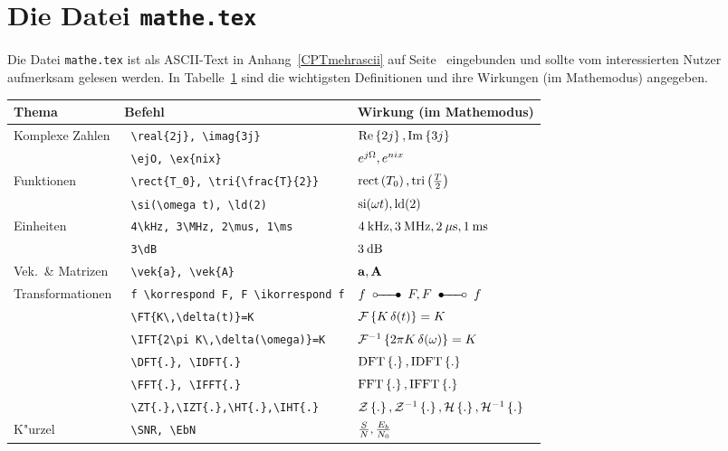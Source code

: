 \section{Die Datei {\tt mathe.tex}} \label{SUBmathe}
%
Die Datei {\tt mathe.tex} ist als ASCII-Text in Anhang~\ref{CPTmehrascii}
auf Seite~\pageref{CPTmehrascii} eingebunden und sollte vom interessierten Nutzer
aufmerksam gelesen werden. In Tabelle~\ref{TABmathe} sind die wichtigsten Definitionen
und ihre Wirkungen (im Mathemodus) angegeben.
%
\begin{table}[htb]\label{TABmathe}
\begin{center}
\begin{tabular}{|l|l|l|}
  \hline
  Thema               & Befehl                                    & Wirkung (im Mathemodus)\\
  \hline
  Komplexe Zahlen     & \verb+ \real{2j}, \imag{3j}             + & $\mathrm{Re}\left\{2j\right\}, \mathrm{Im}\left\{3j\right\}$\\
                      & \verb+ \ejO, \ex{nix}                   + & $e^{j\Omega}, e^{nix}$\\
  Funktionen          & \verb+ \rect{T_0}, \tri{\frac{T}{2}}    + & $\mathrm{rect}\left(T_0\right), \mathrm{tri}\left(\frac{T}{2}\right)$\\
                      & \verb+ \si(\omega t), \ld(2)            + & $\mathrm{si}(\omega t), \mathrm{ld}(2)$\\
  Einheiten           & \verb+ 4\kHz, 3\MHz, 2\mus, 1\ms        + & $4\mathrm{\:kHz}, 3\mathrm{\:MHz}, 2\mathrm{\:\mu s}, 1\mathrm{\:ms}$\\
                      & \verb+ 3\dB                             + & $3\mathrm{\:dB}$\\
  Vek.~\& Matrizen    & \verb+ \vek{a}, \vek{A}                 + & $\mathbf{a}, \mathbf{A}$\\
  Transformationen    & \verb+ f \korrespond F, F \ikorrespond f+ & $f \korrespond F, F \ikorrespond f$\\
                      & \verb+ \FT{K\,\delta(t)}=K              + & ${\cal F}\left\{K\,\delta(t)\right\}=K$\\
                      & \verb+ \IFT{2\pi K\,\delta(\omega)}=K   + & ${\cal F}^{-1}\left\{2\pi K\,\delta(\omega)\right\}=K$\\
                      & \verb+ \DFT{.}, \IDFT{.}                + & $\mathrm{DFT}\left\{.\right\}, \mathrm{IDFT}\left\{.\right\}$\\
                      & \verb+ \FFT{.}, \IFFT{.}                + & $\mathrm{FFT}\left\{.\right\}, \mathrm{IFFT}\left\{.\right\}$\\
                      & \verb+ \ZT{.},\IZT{.},\HT{.},\IHT{.}    + & ${\cal Z}\left\{.\right\}, {\cal Z}^{-1}\left\{.\right\}, {\cal H}\left\{.\right\}, {\cal H}^{-1}\left\{.\right\}$\\
  K"urzel             & \verb+ \SNR, \EbN                       + & $\frac{S}{N}, \frac{E_b}{N_0}$\\
  \hline
\end{tabular}
\end{center}
\end{table}

